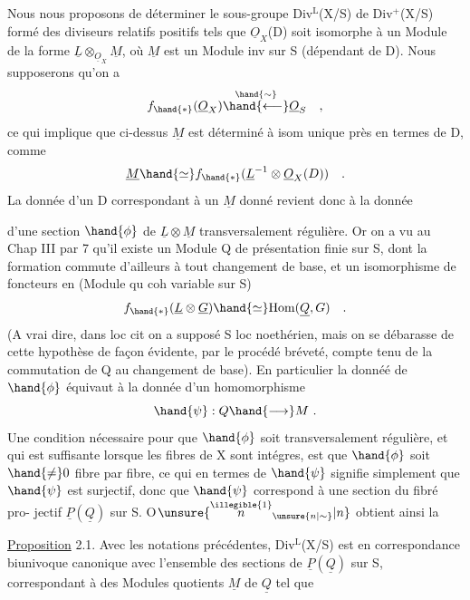 
Nous nous proposons de déterminer le sous-groupe Div$^{\mathrm{L}}$(X/S) de Div$^{+}$(X/S)
formé des diviseurs relatifs positifs tels que $\underline{O}_X$(D) soit isomorphe à
un Module de la forme $\underline{L}\otimes_{\underline{O}_X}\underline{M}$, où $\underline{M}$ est un Module inv sur S (dépendant de
D). Nous supposerons qu'on a
\[ f_{\hand{*}}(\underline{O}_X)\overset{\hand{\sim}}{\hand{\longleftarrow}}\underline{O}_S \quad , \]
ce qui implique que ci-dessus $\underline{M}$ est déterminé à isom unique près en termes
de D, comme
\[ \underline{M}\hand{\simeq} f_{\hand{*}}(\underline{L}^{-1}\otimes\underline{O}_X(D)) \quad . \]
La donnée d'un D correspondant à un $\underline{M}$ donné revient donc à la donnée

d'une section $\hand{\phi}$ de $\underline{L}\otimes\underline{M}$ transversalement régulière. Or on a vu au
Chap III par 7  qu'il  existe un Module Q de
présentation finie sur S, dont la formation commute d'ailleurs à tout
changement de base, et un isomorphisme de foncteurs en  (Module qu coh
variable sur S)
\[ f_{\hand{*}}(\underline{L}\otimes\underline{G})\hand{\simeq} \mathrm{Hom}(\underline{Q},G) \quad . \]
(A vrai dire, dans loc cit on a supposé S loc noethérien, mais on se
débarasse de cette hypothèse de façon évidente, par le procédé bréveté,
compte tenu de la commutation de Q au changement de base). En particulier
la donnéé de $\hand{\phi}$ équivaut à  la donnée d'un homomorphisme
\[ \hand{\psi} : Q \hand{\longrightarrow} M \ . \]
Une condition nécessaire pour que $\hand{\phi}$ soit transversalement régulière, et
qui est suffisante lorsque les fibres de X sont intégres, est que $\hand{\phi}$ soit
$\hand{\neq} 0$  fibre par fibre, ce qui en termes de $\hand{\psi}$ signifie simplement que
$\hand{\psi}$ est surjectif, donc que  $\hand{\psi}$ correspond à une section du fibré pro-%
jectif $\underline{P}(\underline{Q})$ sur S. O$\unsure{\overset{\illegible{1}}{n}_{\unsure{n|\sim}}|n}$ obtient ainsi la

\uline{Proposition} 2.1. Avec les notations  précédentes, Div$^{\mathrm{L}}$(X/S) est
en correspondance biunivoque canonique avec l'ensemble des  sections
de $\underline{P}(\underline{Q})$ sur S, correspondant à des Modules quotients $\underline{M}$ de $\underline{Q}$ tel que

